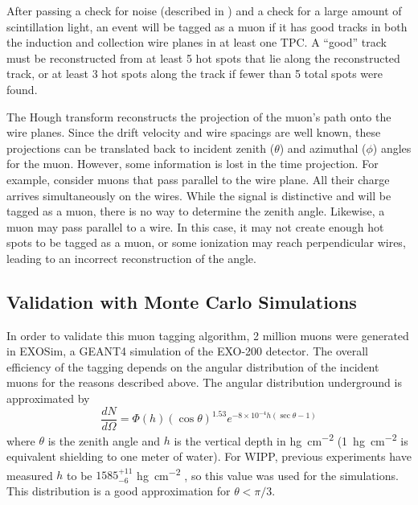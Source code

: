 \documentclass[herrin-thesis.tex]{subfiles}
\begin{document}
After passing a check for noise (described in ) and a check for a large amount of scintillation light, an event will be tagged as a muon if it has good tracks in both the induction and collection wire planes in at least one TPC. A ``good'' track must be reconstructed from at least 5 hot spots that lie along the reconstructed track, or at least 3 hot spots along the track if fewer than 5 total spots were found.

The Hough transform reconstructs the projection of the muon's path onto the wire planes. Since the drift velocity and wire spacings are well known, these projections can be translated back to incident zenith (\(\theta\)) and azimuthal (\(\phi\)) angles for the muon. However, some information is lost in the time projection. For example, consider muons that pass parallel to the wire plane. All their charge arrives simultaneously on the wires. While the signal is distinctive and will be tagged as a muon, there is no way to determine the zenith angle. Likewise, a muon may pass parallel to a wire. In this case, it may not create enough hot spots to be tagged as a muon, or some ionization may reach perpendicular wires, leading to an incorrect reconstruction of the angle.

\subsection{Validation with Monte Carlo Simulations}
In order to validate this muon tagging algorithm, 2 million muons were generated in EXOSim, a GEANT4 \cite{Agostinelli:2003fk} simulation of the EXO-200 detector. The overall efficiency of the tagging depends on the angular distribution of the incident muons for the reasons described above. The angular distribution underground is approximated \cite{miyake:1973} by
\begin{equation}
\label{eq:muon_angular_distribution}
\frac{dN}{d\Omega} = \Phi(h) \left (\cos \theta \right)^{1.53}e^{-8\times10^{-4} h \left(\sec \theta -1\right)}
\end{equation}
where \(\theta\) is the zenith angle and \(h\) is the vertical depth in \si{\hecto\g\per\square\cm} (\SI{1}{\hecto\g\per\square\cm} is equivalent shielding to one meter of water). For WIPP, previous experiments have measured \(h\) to be \(1585^{+11}_{-6}\) \si{\hecto\g\per\square\cm} \cite{Esch:2004zj}, so this value was used for the simulations. This distribution is a good approximation for \(\theta < \pi/3\).
\end{document}

